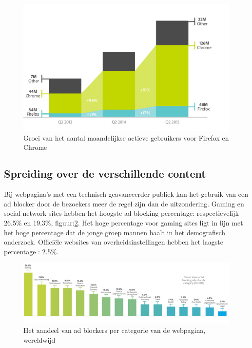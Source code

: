 \documentclass[pdftex,a4paper,12pt,twoside]{report}
\begin{document}
\begin{figure}[h!]
\centering
\includegraphics[width=12cm]{img/UsersPerBrowser}
\caption{Groei van het aantal maandelijkse actieve gebruikers voor Firefox en Chrome}
\label{fig: UsersPerBrowser}
\end{figure}



\subsection{Spreiding over de verschillende content}
\label{sec Spreiding over de verschillende content}
Bij webpagina's met een technisch geavanceerder publiek kan het gebruik van een ad blocker door de bezoekers meer de regel zijn dan de uitzondering. Gaming en social network sites hebben het hoogste ad blocking percentage: respectievelijk 26.5\% en 19.3\%, figuur:\ref{fig: percontent}. Het hoge percentage voor gaming sites ligt in lijn met het hoge percentage dat de jonge groep mannen haalt in het demografisch onderzoek. Officiële websites van overheidsinstellingen hebben het laagste percentage : 2.5\%.

\begin{figure}[h!]
\centering
\includegraphics[width=15cm]{img/percontent}
\caption{Het aandeel van ad blockers per categorie van de webpagina, wereldwijd}
\label{fig: percontent}
\end{figure}
\end{document}
